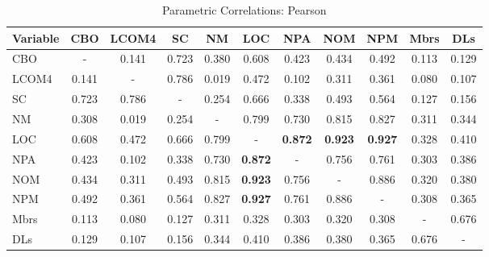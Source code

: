 \documentclass[conference]{IEEEtran}
\begin{document}
\begin{center}
\begin{table*}[tb]
\centering \caption{Parametric Correlations: Pearson}
\begin{tabular}{|l|c|c|c|c|c|c|c|c|c|c|} \hline

\textbf{Variable} & CBO & LCOM4 & SC & NM & LOC & NPA & NOM & NPM & Mbrs & DLs
\\ \hline
CBO & - & 0.141 & 0.723 & 0.380 & 0.608 & 0.423 & 0.434 & 0.492 & 0.113 & 0.129
\\ \hline
LCOM4 & 0.141 & - & 0.786 & 0.019 & 0.472 & 0.102 & 0.311 & 0.361 & 0.080 & 0.107
\\ \hline
SC & 0.723 & 0.786 & - & 0.254 & 0.666 & 0.338 & 0.493 & 0.564 & 0.127 & 0.156
\\ \hline
NM & 0.308 & 0.019 & 0.254 & - & 0.799 & 0.730 & 0.815 & 0.827 & 0.311 & 0.344
\\ \hline
LOC & 0.608 & 0.472 & 0.666 & 0.799 & - & \textbf{0.872} & \textbf{0.923} & \textbf{0.927} & 0.328 & 0.410
\\ \hline
NPA & 0.423 & 0.102 & 0.338 & 0.730 & \textbf{0.872} & - & 0.756 & 0.761 & 0.303 & 0.386
\\ \hline
NOM & 0.434 & 0.311 & 0.493 & 0.815 & \textbf{0.923} & 0.756 & - & 0.886 & 0.320 & 0.380
\\ \hline
NPM & 0.492 & 0.361 & 0.564 & 0.827 & \textbf{0.927} & 0.761 & 0.886 & - & 0.308 & 0.365
\\ \hline
Mbrs & 0.113 & 0.080 & 0.127 & 0.311 & 0.328 & 0.303 & 0.320 & 0.308 & - & 0.676
\\ \hline
DLs & 0.129 & 0.107 & 0.156 & 0.344 & 0.410 & 0.386 & 0.380 & 0.365 & 0.676 & -
\\ \hline
\end{tabular}
\label{pearson}
\end{table*}
\end{center}
\end{document}
